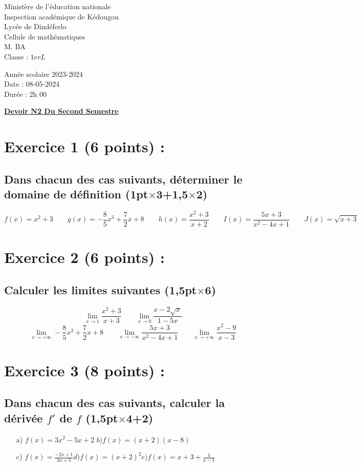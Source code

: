 \documentclass{article}
\begin{document}
\begin{minipage}{0.5\textwidth}
	Ministère de l'éducation nationale  \\
	Inspection académique de Kédougou   \\
	Lycée de Dindéferlo            \\
	Cellule de mathématiques            \\
	M. BA                          \\
	Classe : $1erL$  \\
\end{minipage}
\begin{minipage}{0.5\textwidth}
	Année scolaire 2023-2024 \\
	Date : 08-05-2024 \\
	Durée : 2h 00 \\
\end{minipage}

\begin{center}
	\textbf{{\underline{ Devoir N2 Du Second Semestre}}}
\end{center}
\section*{Exercice 1 (6 points) :}
\subsection*{Dans chacun des cas suivants, déterminer le domaine de définition \textbf{(1pt$\times$3+1,5$\times$2)}}
\[ f(x)=x^2+3 \quad\quad g(x)=-\frac{8}{5}x^{3}+\frac{7}{2}x+8\quad\quad
h(x)=\frac{x^2+3}{x+2}\quad\quad I(x)=\frac{5x+3}{x^{2}-4x+1}\quad\quad J(x)=\sqrt{x+3}\]
\section*{Exercice 2 (6 points) :}
\subsection*{Calculer les limites suivantes \textbf{(1,5pt$\times$6)}}
\[\lim_{x \to 1}\frac{x^{2}+3}{x+3}\quad\quad\lim_{x \to 0}\frac{x-2\sqrt{x}}{1-5x}\]
\[\lim_{x \to +\infty}-\frac{8}{5}x^{3}+\frac{7}{2}x+8\quad\quad \lim_{x \to -\infty}\frac{5x+3}{x^{2}-4x+1}\quad\quad \lim_{x \to +\infty}\frac{x^{2}-9}{x-3}\]
\section*{Exercice 3 (8 points) :}
\subsection*{ Dans chacun des cas suivants, calculer la dérivée $f'$ de $f$ \textbf{(1,5pt$\times$4+2)}}
\begin{itemize}
\item[a)]$f(x)=3x^{2}-5x+2$\quad\quad 
$b)f(x)=(x+2)(x-8)$
\item[c)]$f(x)=\frac{-2x+1}{3x+5}$\quad\quad $d)f(x)=(x+2)^{2}$\quad\quad $e)f(x)=x+3+\frac{4}{x-1}$
\end{itemize}
\end{document}
